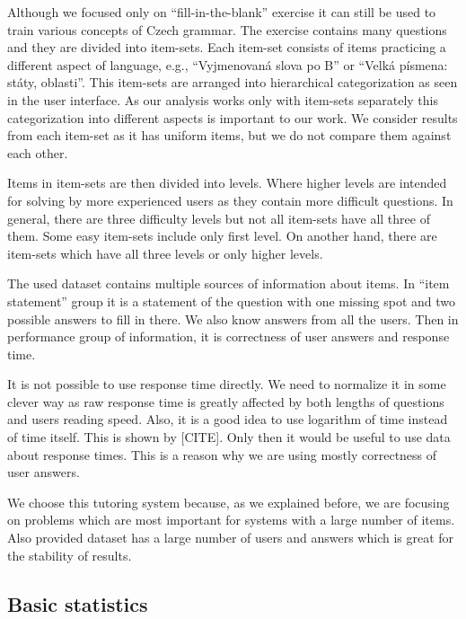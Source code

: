 \documentclass[
  digital, %
  table,   %
  nolof,     %
  nolot,     %
  nocover,
  color
]{fithesis3}
\begin{document}
Although we focused only on ``fill-in-the-blank'' exercise it can still be used to train various concepts of Czech grammar. The exercise contains many questions and they are divided into item-sets. Each item-set consists of items practicing a different aspect of language, e.g., ``Vyjmenovaná slova po B'' or ``Velká písmena: státy, oblasti''. This item-sets are arranged into hierarchical categorization as seen in the user interface. As our analysis works only with item-sets separately this categorization into different aspects is important to our work. We consider results from each item-set as it has uniform items, but we do not compare them against each other.

Items in item-sets are then divided into levels. Where higher levels are intended for solving by more experienced users as they contain more difficult questions. In general, there are three difficulty levels but not all item-sets have all three of them. Some easy item-sets include only first level. On another hand, there are item-sets which have all three levels or only higher levels.


The used dataset contains multiple sources of information about items. In ``item statement'' group it is a statement of the question with one missing spot and two possible answers to fill in there. We also know answers from all the users. Then in performance group of information, it is correctness of user answers and response time.

It is not possible to use response time directly. We need to normalize it in some clever way as raw response time is greatly affected by both lengths of questions and users reading speed. Also, it is a good idea to use logarithm of time instead of time itself. This is shown by [CITE]. Only then it would be useful to use data about response times. This is a reason why we are using mostly correctness of user answers.


We choose this tutoring system because, as we explained before, we are focusing on problems which are most important for systems with a large number of items. Also provided dataset has a large number of users and answers which is great for the stability of results.


\subsection{Basic statistics}\label{basic-statistics}
\end{document}
